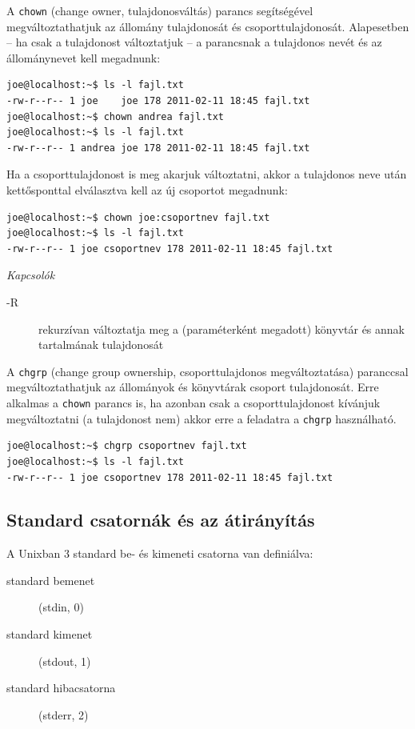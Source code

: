        
A \verb.chown. (change owner, tulajdonosváltás) parancs segítségével megváltoztathatjuk az állomány tulajdonosát és csoporttulajdonosát. Alapesetben -- ha csak a tulajdonost változtatjuk -- a parancsnak a tulajdonos nevét és az állománynevet kell megadnunk:

\begin{lstlisting}
joe@localhost:~$ ls -l fajl.txt 
-rw-r--r-- 1 joe    joe 178 2011-02-11 18:45 fajl.txt
joe@localhost:~$ chown andrea fajl.txt 
joe@localhost:~$ ls -l fajl.txt 
-rw-r--r-- 1 andrea joe 178 2011-02-11 18:45 fajl.txt
\end{lstlisting}

Ha a csoporttulajdonost is meg akarjuk változtatni, akkor a tulajdonos neve után kettősponttal elválasztva kell az új csoportot megadnunk:

\begin{lstlisting}
joe@localhost:~$ chown joe:csoportnev fajl.txt
joe@localhost:~$ ls -l fajl.txt 
-rw-r--r-- 1 joe csoportnev 178 2011-02-11 18:45 fajl.txt
\end{lstlisting}

\medskip
\textit{Kapcsolók}
\begin{description}
\item[-R] rekurzívan változtatja meg a (paraméterként megadott) könyvtár és annak tartalmának tulajdonosát
\end{description}
\bigskip

\noindent{}\bigskip

A \verb.chgrp. (change group ownership, csoporttulajdonos megváltoztatása) paranccsal megváltoztathatjuk az állományok és könyvtárak csoport tulajdonosát. Erre alkalmas a \verb.chown. parancs is, ha azonban csak a csoporttulajdonost kívánjuk megváltoztatni (a tulajdonost nem) akkor erre a feladatra a \verb.chgrp. használható.


\begin{lstlisting}
joe@localhost:~$ chgrp csoportnev fajl.txt
joe@localhost:~$ ls -l fajl.txt 
-rw-r--r-- 1 joe csoportnev 178 2011-02-11 18:45 fajl.txt
\end{lstlisting}




\subsection{Standard csatornák és az átirányítás}
A Unixban 3 standard be- és kimeneti csatorna van definiálva:
\begin{description}
\item[standard bemenet] (stdin, 0)
\item[standard kimenet] (stdout, 1)
\item[standard hibacsatorna] (stderr, 2)
\end{description}
 
